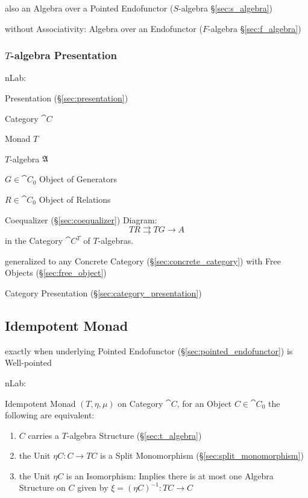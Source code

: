 also an Algebra over a Pointed Endofunctor ($S$-algebra
\S\ref{sec:s_algebra})

without Associativity: Algebra over an Endofunctor
($F$-algebra \S\ref{sec:f_algebra})



\subsubsection{$T$-algebra Presentation}
\label{sec:t_algebra_presentation}

nLab:

Presentation (\S\ref{sec:presentation})

Category $\cat{C}$

Monad $T$

$T$-algebra $\mathfrak{A}$

$G \in \cat{C}_0$ Object of Generators

$R \in \cat{C}_0$ Object of Relations

Coequalizer (\S\ref{sec:coequalizer}) Diagram:
\[
  T R \rightrightarrows T G \rightarrow A
\]
in the Category $\cat{C}^T$ of $T$-algebras. %

generalized to any Concrete Category (\S\ref{sec:concrete_category})
with Free Objects (\S\ref{sec:free_object}) %

Category Presentation (\S\ref{sec:category_presentation})



\subsection{Idempotent Monad}\label{sec:idempotent_monad}

exactly when underlying Pointed Endofunctor
(\S\ref{sec:pointed_endofunctor}) is Well-pointed

nLab:

Idempotent Monad $(T, \eta, \mu)$ on Category $\cat{C}$, for an Object
$C \in \cat{C}_0$ the following are equivalent:
\begin{enumerate}
  \item $C$ carries a $T$-algebra Structure (\S\ref{sec:t_algebra})
  \item the Unit $\eta C : C \rightarrow T C$ is a Split Monomorphism
    (\S\ref{sec:split_monomorphism})
  \item the Unit $\eta C$ is an Isomorphism: Implies there is at most
    one Algebra Structure on $C$ given by $\xi = (\eta C)^{-1} : T C
    \rightarrow C$ %
\end{enumerate}




